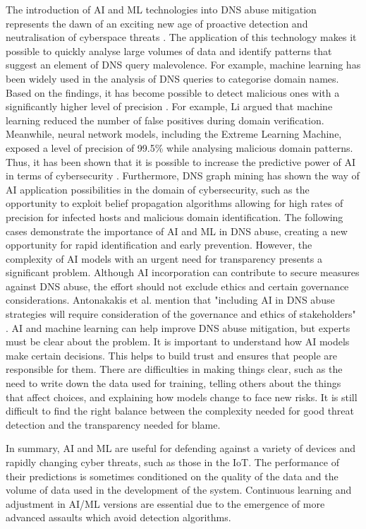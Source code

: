 The introduction of AI and ML technologies into DNS abuse mitigation represents the dawn of an exciting new age of proactive detection and neutralisation of cyberspace threats \cite{tariq2023critical}. The application of this technology makes it possible to quickly analyse large volumes of data and identify patterns that suggest an element of DNS query malevolence. For example, machine learning has been widely used in the analysis of DNS queries to categorise domain names. Based on the findings, it has become possible to detect malicious ones with a significantly higher level of precision \cite{LiMaliciousDomainDetection2020}. For example, Li argued that machine learning reduced the number of false positives during domain verification. Meanwhile, neural network models, including the Extreme Learning Machine, exposed a level of precision of 99.5\% while analysing malicious domain patterns. Thus, it has been shown that it is possible to increase the predictive power of AI in terms of cybersecurity \cite{ZouDNSGraphMining2015}. Furthermore, DNS graph mining has shown the way of AI application possibilities in the domain of cybersecurity, such as the opportunity to exploit belief propagation algorithms allowing for high rates of precision for infected hosts and malicious domain identification. The following cases demonstrate the importance of AI and ML in DNS abuse, creating a new opportunity for rapid identification and early prevention. However, the complexity of AI models with an urgent need for transparency presents a significant problem. Although AI incorporation can contribute to secure measures against DNS abuse, the effort should not exclude ethics and certain governance considerations. Antonakakis et al. mention that "including AI in DNS abuse strategies will require consideration of the governance and ethics of stakeholders" \cite{AntonakakisMalwareDomainsUpperDNS2011}.  AI and machine learning can help improve DNS abuse mitigation, but experts must be clear about the problem.  It is important to understand how AI models make certain decisions. This helps to build trust and ensures that people are responsible for them. There are difficulties in making things clear, such as the need to write down the data used for training, telling others about the things that affect choices, and explaining how models change to face new risks. It is still difficult to find the right balance between the complexity needed for good threat detection and the transparency needed for blame.

In summary, AI and ML are useful for defending against a variety of devices and rapidly changing cyber threats, such as those in the IoT. The performance of their predictions is sometimes conditioned on the quality of the data and the volume of data used in the development of the system. Continuous learning and adjustment in AI/ML versions are essential due to the emergence of more advanced assaults which avoid detection algorithms.


